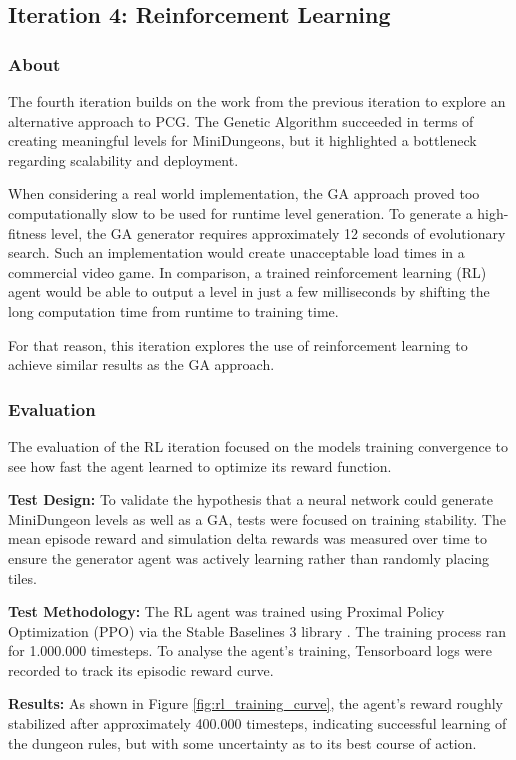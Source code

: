 \subsection{Iteration 4: Reinforcement Learning}
\subsubsection{About}
The fourth iteration builds on the work from the previous iteration to explore an alternative approach to PCG. The Genetic Algorithm succeeded in terms
of creating meaningful levels for MiniDungeons, but it highlighted a bottleneck regarding scalability and deployment. 

When considering a real world implementation, the GA approach proved too computationally slow to be used for runtime level generation. 
To generate a high-fitness level, the GA generator requires approximately 12 seconds of evolutionary search.
Such an implementation would create unacceptable load times in a commercial video game. In comparison, a trained reinforcement learning (RL) agent 
would be able to output a level in just a few milliseconds \cite{khalifa2020pcgrl} by shifting the long computation time from runtime to training time. 

For that reason, this iteration explores the use of reinforcement learning to achieve similar results as the GA approach. 

\subsubsection{Evaluation}
The evaluation of the RL iteration focused on the models training convergence to see how fast the agent learned to optimize its reward function.

\textbf{Test Design:}
To validate the hypothesis that a neural network could generate MiniDungeon levels as well as a GA, tests were focused on training stability.
The mean episode reward and simulation delta rewards was measured over time to ensure the generator agent was actively learning rather 
than randomly placing tiles.

\textbf{Test Methodology:}
The RL agent was trained using Proximal Policy Optimization (PPO) \cite{schulman2017proximalpolicyoptimizationalgorithms} via the 
Stable Baselines 3 library \cite{stable-baselines3}. The training process ran for 1.000.000 timesteps. To analyse the agent's training,
Tensorboard logs were recorded to track its episodic reward curve.

\textbf{Results:}
As shown in Figure \ref{fig:rl_training_curve}, the agent's reward roughly stabilized after approximately 400.000 timesteps, 
indicating successful learning of the dungeon rules, but with some uncertainty as to its best course of action.

